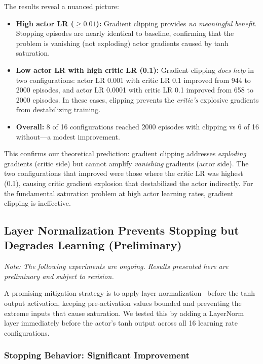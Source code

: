 The results reveal a nuanced picture:

\begin{itemize}
    \item \textbf{High actor LR ($\geq 0.01$):} Gradient clipping provides \textit{no meaningful benefit}. Stopping episodes are nearly identical to baseline, confirming that the problem is vanishing (not exploding) actor gradients caused by tanh saturation.

    \item \textbf{Low actor LR with high critic LR (0.1):} Gradient clipping \textit{does help} in two configurations: actor LR 0.001 with critic LR 0.1 improved from 944 to 2000 episodes, and actor LR 0.0001 with critic LR 0.1 improved from 658 to 2000 episodes. In these cases, clipping prevents the \textit{critic's} explosive gradients from destabilizing training.

    \item \textbf{Overall:} 8 of 16 configurations reached 2000 episodes with clipping vs 6 of 16 without---a modest improvement.
\end{itemize}

This confirms our theoretical prediction: gradient clipping addresses \textit{exploding} gradients (critic side) but cannot amplify \textit{vanishing} gradients (actor side). The two configurations that improved were those where the critic LR was highest (0.1), causing critic gradient explosion that destabilized the actor indirectly. For the fundamental saturation problem at high actor learning rates, gradient clipping is ineffective.

\subsection{Layer Normalization Prevents Stopping but Degrades Learning (Preliminary)}

\textit{Note: The following experiments are ongoing. Results presented here are preliminary and subject to revision.}

A promising mitigation strategy is to apply layer normalization~\cite{ba2016layer} before the tanh output activation, keeping pre-activation values bounded and preventing the extreme inputs that cause saturation. We tested this by adding a LayerNorm layer immediately before the actor's tanh output across all 16 learning rate configurations.

\subsubsection{Stopping Behavior: Significant Improvement}

